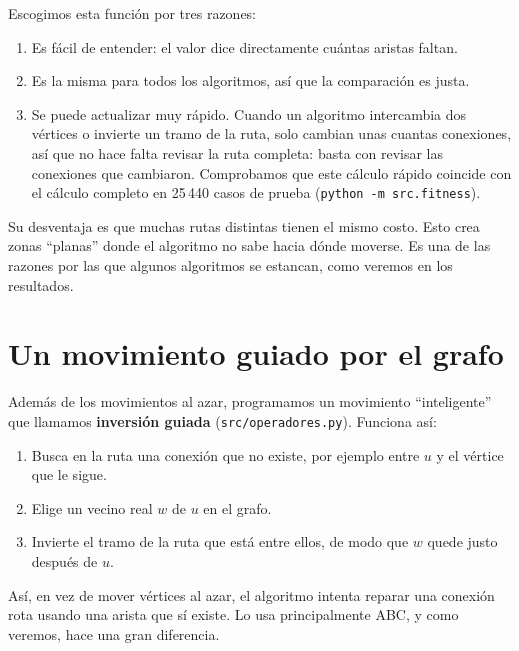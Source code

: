 Escogimos esta función por tres razones:
\begin{enumerate}
  \item Es fácil de entender: el valor dice directamente cuántas aristas faltan.
  \item Es la misma para todos los algoritmos, así que la comparación es justa.
  \item Se puede actualizar muy rápido. Cuando un algoritmo intercambia dos vértices o invierte
        un tramo de la ruta, solo cambian unas cuantas conexiones, así que no hace falta revisar
        la ruta completa: basta con revisar las conexiones que cambiaron. Comprobamos que este
        cálculo rápido coincide con el cálculo completo en 25\,440 casos de prueba
        (\texttt{python -m src.fitness}).
\end{enumerate}

Su desventaja es que muchas rutas distintas tienen el mismo costo. Esto crea zonas ``planas''
donde el algoritmo no sabe hacia dónde moverse. Es una de las razones por las que algunos
algoritmos se estancan, como veremos en los resultados.

\section{Un movimiento guiado por el grafo}
Además de los movimientos al azar, programamos un movimiento ``inteligente'' que llamamos
\textbf{inversión guiada} (\texttt{src/operadores.py}). Funciona así:
\begin{enumerate}
  \item Busca en la ruta una conexión que no existe, por ejemplo entre $u$ y el vértice que le
        sigue.
  \item Elige un vecino real $w$ de $u$ en el grafo.
  \item Invierte el tramo de la ruta que está entre ellos, de modo que $w$ quede justo después
        de $u$.
\end{enumerate}
Así, en vez de mover vértices al azar, el algoritmo intenta reparar una conexión rota usando una
arista que sí existe. Lo usa principalmente ABC, y como veremos, hace una gran diferencia.
